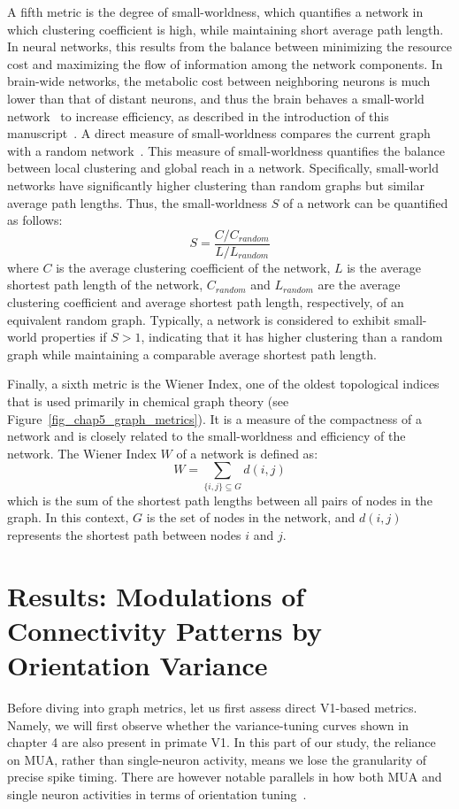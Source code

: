 A fifth metric is the degree of small-worldness, which quantifies a network in which clustering coefficient is high, while maintaining short average path length. In neural networks, this results from the balance between minimizing the resource cost and maximizing the flow of information among the network components. In brain-wide networks, the metabolic cost between neighboring neurons is much lower than that of distant neurons, and thus the brain behaves a small-world network~\cite{liao2017small} to increase efficiency, as described in the introduction of this manuscript~\cite{barlow1961possible}.
A direct measure of small-worldness compares the current graph with a random network~\cite{watts1998collective}. This measure of small-worldness quantifies the balance between local clustering and global reach in a network. Specifically, small-world networks have significantly higher clustering than random graphs but similar average path lengths. Thus, the small-worldness \( S \) of a network can be quantified as follows:
\begin{equation}
    S = \frac{C / C_{random}}{L / L_{random}}
\end{equation}
where \( C \) is the average clustering coefficient of the network, \( L \) is the average shortest path length of the network, \( C_{random} \) and \( L_{random} \) are the average clustering coefficient and average shortest path length, respectively, of an equivalent random graph. Typically, a network is considered to exhibit small-world properties if \( S > 1 \), indicating that it has higher clustering than a random graph while maintaining a comparable average shortest path length. 

Finally, a sixth metric is the Wiener Index, one of the oldest topological indices~\cite{diudea1998wiener} that is used primarily in chemical graph theory (see Figure~\ref{fig_chap5_graph_metrics}). It is a measure of the compactness of a network and is closely related to the small-worldness and efficiency of the network.
 The Wiener Index \( W \) of a network is defined as:
 \begin{equation}
     W = \sum_{\{i,j\} \subseteq G} d(i, j)
 \end{equation}
which is the sum of the shortest path lengths between all pairs of nodes in the graph. In this context, \( G \) is the set of nodes in the network, and \( d(i, j) \) represents the shortest path between nodes \( i \) and \( j \).



\section{Results: Modulations of Connectivity Patterns by Orientation Variance}
Before diving into graph metrics, let us first assess direct \gls{V1}-based metrics. Namely, we will first observe whether the variance-tuning curves shown in chapter 4 are also present in primate \gls{V1}. In this part of our study, the reliance on \gls{MUA}, rather than single-neuron activity,  means we lose the granularity of precise spike timing. There are however notable parallels in how both \gls{MUA} and single neuron activities in terms of orientation tuning~\cite{lange2023weak}. 

